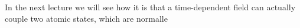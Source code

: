 In the next lecture we will see how it is that a time-dependent field can actually couple two atomic states, which are normalle